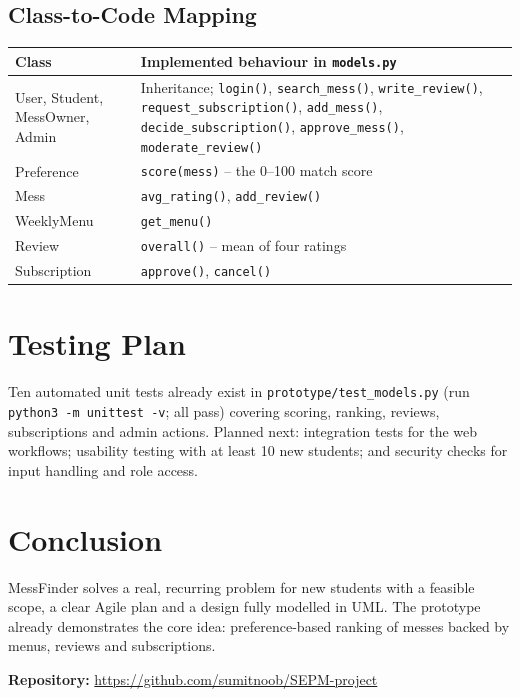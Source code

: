 \documentclass[11pt,a4paper]{article}
\newcommand{\RepoURL}{https://github.com/sumitnoob/SEPM-project}
\begin{document}
\subsection{Class-to-Code Mapping}
\begin{tabular}{@{}p{3.5cm}p{11.5cm}@{}}\toprule
\textbf{Class} & \textbf{Implemented behaviour in \texttt{models.py}}\\\midrule
User, Student, MessOwner, Admin & Inheritance; \texttt{login()}, \texttt{search\_mess()}, \texttt{write\_review()}, \texttt{request\_subscription()}, \texttt{add\_mess()}, \texttt{decide\_subscription()}, \texttt{approve\_mess()}, \texttt{moderate\_review()}\\
Preference & \texttt{score(mess)} -- the 0--100 match score\\
Mess & \texttt{avg\_rating()}, \texttt{add\_review()}\\
WeeklyMenu & \texttt{get\_menu()}\\
Review & \texttt{overall()} -- mean of four ratings\\
Subscription & \texttt{approve()}, \texttt{cancel()}\\\bottomrule
\end{tabular}

\section{Testing Plan}
Ten automated unit tests already exist in \texttt{prototype/test\_models.py} (run \texttt{python3 -m unittest -v}; all pass) covering scoring, ranking, reviews, subscriptions and admin actions. Planned next: integration tests for the web workflows; usability testing with at least 10 new students; and security checks for input handling and role access.

\section{Conclusion}
MessFinder solves a real, recurring problem for new students with a feasible scope, a clear Agile plan and a design fully modelled in UML. The prototype already demonstrates the core idea: preference-based ranking of messes backed by menus, reviews and subscriptions.

\vspace{1em}\noindent\textbf{Repository:} \url{\RepoURL}
\end{document}
